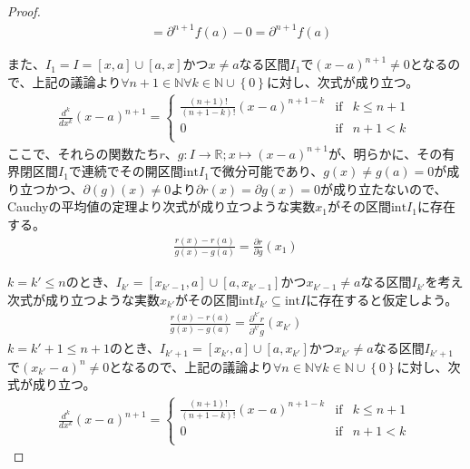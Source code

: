 \documentclass[dvipdfmx]{jsarticle}
\begin{document}
\begin{proof}
\begin{align*}
&= \partial^{n + 1}f(a) - 0 = \partial^{n + 1}f(a)
\end{align*}\par
また、$I_{1} = I = [ x,a] \cup [ a,x]$かつ$x \neq a$なる区間$I_{1}$で$(x - a)^{n + 1} \neq 0$となるので、上記の議論より$\forall n + 1 \in \mathbb{N}\forall k \in \mathbb{N} \cup \left\{ 0 \right\}$に対し、次式が成り立つ。
\begin{align*}
\frac{d^{k}}{dx^{k}}(x - a)^{n + 1} = \left\{ \begin{matrix}
\frac{(n + 1)!}{(n + 1 - k)!}(x - a)^{n + 1 - k} & \mathrm{if} & k \leq n + 1 \\
0 & \mathrm{if} & n + 1 < k \\
\end{matrix} \right.\ 
\end{align*}
ここで、それらの関数たち$r$、$g:I \rightarrow \mathbb{R};x \mapsto (x - a)^{n + 1}$が、明らかに、その有界閉区間$I_{1}$で連続でその開区間$\mathrm{int}I_{1}$で微分可能であり、$g(x) \neq g(a) = 0$が成り立つかつ、$\partial(g)(x) \neq 0$より$\partial r(x) = \partial g(x) = 0$が成り立たないので、Cauchyの平均値の定理より次式が成り立つような実数$x_{1}$がその区間$\mathrm{int}I_{1}$に存在する。
\begin{align*}
\frac{r(x) - r(a)}{g(x) - g(a)} = \frac{\partial r}{\partial g}\left( x_{1} \right)
\end{align*}\par
$k = k' \leq n$のとき、$I_{k'} = \left[ x_{k' - 1},a \right] \cup \left[ a,x_{k' - 1} \right]$かつ$x_{k' - 1} \neq a$なる区間$I_{k'}$を考え次式が成り立つような実数$x_{k'}$がその区間$\mathrm{int}I_{k'} \subseteq \mathrm{int}I$に存在すると仮定しよう。
\begin{align*}
\frac{r(x) - r(a)}{g(x) - g(a)} = \frac{\partial^{k'}r}{\partial^{k'}g}\left( x_{k'} \right)
\end{align*}
$k = k' + 1 \leq n + 1$のとき、$I_{k' + 1} = \left[ x_{k'},a \right] \cup \left[ a,x_{k'} \right]$かつ$x_{k'} \neq a$なる区間$I_{k' + 1}$で$\left( x_{k'} - a \right)^{n} \neq 0$となるので、上記の議論より$\forall n \in \mathbb{N}\forall k \in \mathbb{N} \cup \left\{ 0 \right\}$に対し、次式が成り立つ。
\begin{align*}
\frac{d^{k}}{dx^{k}}(x - a)^{n + 1} = \left\{ \begin{matrix}
\frac{(n + 1)!}{(n + 1 - k)!}(x - a)^{n + 1 - k} & \mathrm{if} & k \leq n + 1 \\
0 & \mathrm{if} & n + 1 < k \\
\end{matrix} \right.\ 

\end{align*}
\end{proof}
\end{document}
